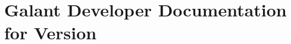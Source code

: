 \documentclass{article}
\begin{document}
\section{Galant Developer Documentation for Version~\VERSION}


\end{document}
